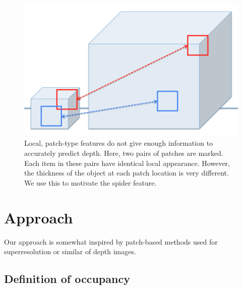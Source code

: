 \documentclass[10pt,twocolumn,letterpaper]{article}
\begin{document}
\begin{figure}
  \centering 
  \includegraphics[width=0.9\columnwidth]{patch_sizes.png}
      
  \caption{Local, patch-type features do not give enough information to accurately predict depth. Here, two pairs of patches are marked. Each item in these pairs have identical local appearance. However, the thickness of the object at each patch location is very different. We use this to motivate the spider feature.}
\end{figure}


\section{Approach}

Our approach is somewhat inspired by patch-based methods used for superresolution or similar of depth images. 





\subsection{Definition of occupancy}
\end{document}
